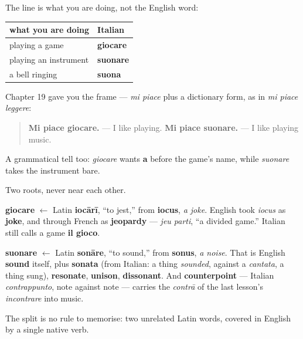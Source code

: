 The line is what you are doing, not the English word:

\noindent
\begin{tabularx}{\linewidth}{@{}>{\raggedright\arraybackslash}X>{\raggedright\arraybackslash}X@{}}
\toprule
\textbf{what you are doing} & \textbf{Italian} \\
\midrule
playing a game & \textbf{giocare} \\
playing an instrument & \textbf{suonare} \\
a bell ringing & \textbf{suona} \\
\bottomrule
\end{tabularx}

Chapter 19 gave you the frame — \emph{mi piace} plus a dictionary form, as in \emph{mi piace leggere}:

\begin{quote}
\textbf{Mi piace giocare.} — I like playing. \textbf{Mi piace suonare.} — I like playing music.
\end{quote}

A grammatical tell too: \emph{giocare} wants \textbf{a} before the game's name, while \emph{suonare} takes the instrument bare.

\begin{cousinweb}
Two roots, never near each other.

\textbf{giocare} $\leftarrow$ Latin \textbf{iocārī}, \textquotedblleft{}to jest,\textquotedblright{} from \textbf{iocus}, \emph{a joke}. English took \emph{iocus} as \textbf{joke}, and through French as \textbf{jeopardy} — \emph{jeu parti}, \textquotedblleft{}a divided game.\textquotedblright{} Italian still calls a game \textbf{il gioco}.

\textbf{suonare} $\leftarrow$ Latin \textbf{sonāre}, \textquotedblleft{}to sound,\textquotedblright{} from \textbf{sonus}, \emph{a noise}. That is English \textbf{sound} itself, plus \textbf{sonata} (from Italian: a thing \emph{sounded}, against a \emph{cantata}, a thing sung), \textbf{resonate}, \textbf{unison}, \textbf{dissonant}. And \textbf{counterpoint} — Italian \emph{contrappunto}, note against note — carries the \emph{contrā} of the last lesson's \emph{incontrare} into music.

The split is no rule to memorise: two unrelated Latin words, covered in English by a single native verb.
\end{cousinweb}

